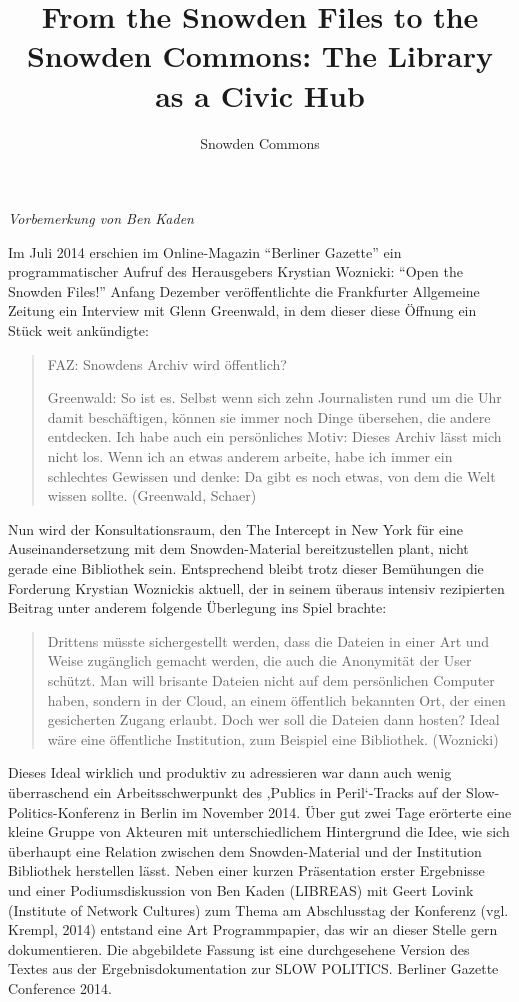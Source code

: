 \documentclass[a4paper,
fontsize=11pt,
oneside,
numbers=noperiodatend,
parskip=half-,
bibliography=totoc,
final
]{scrartcl}
\title{\LARGE{From the Snowden Files to the Snowden Commons: The Library as a Civic Hub}} %
\author{Snowden Commons} %
\date{}
\begin{document}
\maketitle
\thispagestyle{fancyplain} 


\emph{Vorbemerkung von Ben Kaden}

Im Juli 2014 erschien im Online-Magazin \enquote{Berliner Gazette} ein
programmatischer Aufruf des Herausgebers Krystian Woznicki:
\enquote{Open the Snowden Files!} Anfang Dezember veröffentlichte die
Frankfurter Allgemeine Zeitung ein Interview mit Glenn Greenwald, in dem
dieser diese Öffnung ein Stück weit ankündigte:

\begin{quote}
FAZ: Snowdens Archiv wird öffentlich?

Greenwald: So ist es. Selbst wenn sich zehn Journalisten rund um die Uhr
damit beschäftigen, können sie immer noch Dinge übersehen, die andere
entdecken. Ich habe auch ein persönliches Motiv: Dieses Archiv lässt
mich nicht los. Wenn ich an etwas anderem arbeite, habe ich immer ein
schlechtes Gewissen und denke: Da gibt es noch etwas, von dem die Welt
wissen sollte. (Greenwald, Schaer)
\end{quote}

Nun wird der Konsultationsraum, den The Intercept in New York für eine
Auseinandersetzung mit dem Snowden-Material bereitzustellen plant, nicht
gerade eine Bibliothek sein. Ent\-sprech\-end bleibt trotz dieser Bemühungen
die Forderung Krystian Woznickis aktuell, der in seinem überaus intensiv
rezipierten Beitrag unter anderem folgende Überlegung ins Spiel brachte:

\begin{quote}
Drittens müsste sichergestellt werden, dass die Dateien in einer Art und
Weise zu\-gäng\-lich gemacht werden, die auch die Anonymität der User
schützt. Man will brisante Dateien nicht auf dem persönlichen Computer
haben, sondern in der Cloud, an einem öffentlich bekannten Ort, der
einen gesicherten Zugang erlaubt. Doch wer soll die Dateien dann hosten?
Ideal wäre eine öffentliche Institution, zum Beispiel eine Bibliothek.
(Woznicki)
\end{quote}

Dieses Ideal wirklich und produktiv zu adressieren war dann auch wenig
überraschend ein Arbeitsschwerpunkt des ‚Publics in Peril`-Tracks auf
der Slow-Politics-Konferenz in Berlin im November 2014. Über gut zwei
Tage erörterte eine kleine Gruppe von Akteuren mit unterschiedlichem
Hintergrund die Idee, wie sich überhaupt eine Relation zwischen dem
Snowden-Material und der Institution Bibliothek herstellen lässt. Neben
einer kurzen Präsentation erster Ergebnisse und einer Podiumsdiskussion
von Ben Kaden (LIBREAS) mit Geert Lovink (Institute of Network Cultures)
zum Thema am Abschlusstag der Konferenz (vgl. Krempl, 2014) entstand
eine Art Programmpapier, das wir an dieser Stelle gern dokumentieren.
Die abgebildete Fassung ist eine durchgesehene Version des Textes aus
der Ergebnisdokumentation zur SLOW POLITICS. Berliner Gazette Conference
2014.
\end{document}
